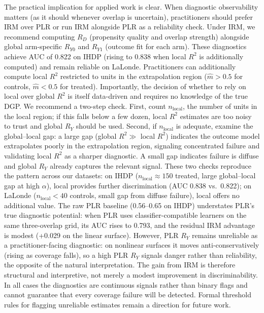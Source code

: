 \documentclass[12pt]{article}
\begin{document}
The practical implication for applied work is clear. When diagnostic observability matters (as it should whenever overlap is uncertain), practitioners should prefer IRM over PLR or run IRM alongside PLR as a reliability check. Under IRM, we recommend computing $R_D$ (propensity quality and overlap strength) alongside global arm-specific $R_{Y0}$ and $R_{Y1}$ (outcome fit for each arm). These diagnostics achieve AUC of 0.822 on IHDP (rising to 0.838 when local $R^2$ is additionally computed) and remain reliable on LaLonde. Practitioners can additionally compute local $R^2$ restricted to units in the extrapolation region ($\hat{m}>0.5$ for controls, $\hat{m}<0.5$ for treated). Importantly, the decision of whether to rely on local over global $R^2$ is itself data-driven and requires no knowledge of the true DGP. We recommend a two-step check. First, count $n_{\text{local}}$, the number of units in the local region; if this falls below a few dozen, local $R^2$ estimates are too noisy to trust and global $R_Y$ should be used. Second, if $n_{\text{local}}$ is adequate, examine the global--local gap: a large gap (global $R^2 \gg$ local $R^2$) indicates the outcome model extrapolates poorly in the extrapolation region, signaling concentrated failure and validating local $R^2$ as a sharper diagnostic. A small gap indicates failure is diffuse and global $R_Y$ already captures the relevant signal. These two checks reproduce the pattern across our datasets: on IHDP ($n_{\text{local}} \approx 150$ treated, large global--local gap at high $\alpha$), local provides further discrimination (AUC 0.838 vs.\ 0.822); on LaLonde ($n_{\text{local}} < 40$ controls, small gap from diffuse failure), local offers no additional value. The raw PLR baseline (0.56--0.65 on IHDP) understates PLR's true diagnostic potential: when PLR uses classifier-compatible learners on the same three-overlap grid, its AUC rises to 0.793, and the residual IRM advantage is modest (+0.029 on the linear surface). However, PLR $R_Y$ remains unreliable as a practitioner-facing diagnostic: on nonlinear surfaces it moves anti-conservatively (rising as coverage falls), so a high PLR $R_Y$ signals danger rather than reliability, the opposite of the natural interpretation. The gain from IRM is therefore structural and interpretive, not merely a modest improvement in discriminability. In all cases the diagnostics are continuous signals rather than binary flags and cannot guarantee that every coverage failure will be detected. Formal threshold rules for flagging unreliable estimates remain a direction for future work.
\end{document}
